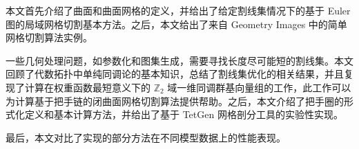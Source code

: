 本文首先介绍了曲面和曲面网格的定义，并给出了给定割线集情况下的基于 Euler 图的局域网格切割基本方法。之后，本文给出了来自 Geometry Images 中的简单网格切割算法实例。
  
一些几何处理问题，如参数化和图集生成，需要寻找长度尽可能短的割线集。本文回顾了代数拓扑中单纯同调论的基本知识，总结了割线集优化的相关结果，并且复现了计算在权重函数最短意义下的 $ \mathbb{Z}_2 $ 域一维同调群基向量组的工作，此工作可以为计算基于把手链的闭曲面网格切割算法提供帮助。之后，本文介绍了把手圈的形式化定义和基本计算方法，并给出了基于 TetGen 网格剖分工具的实验性实现。

最后，本文对比了实现的部分方法在不同模型数据上的性能表现。










